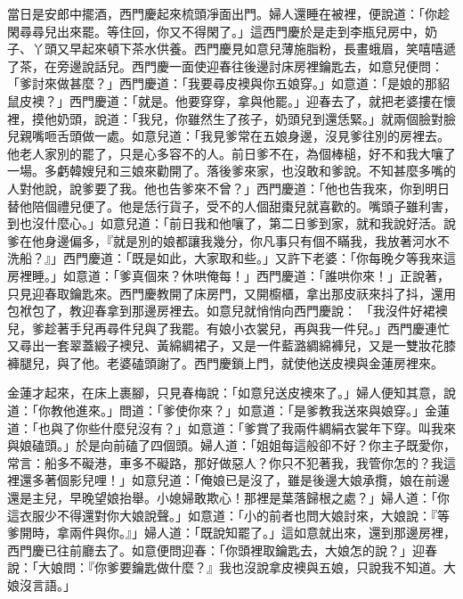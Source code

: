 當日是安郎中擺酒，西門慶起來梳頭凈面出門。婦人還睡在被裡，便說道：「你趁閑尋尋兒出來罷。等住回，你又不得閑了。」這西門慶於是走到李瓶兒房中，奶子、丫頭又早起來頓下茶水供養。西門慶見如意兒薄施脂粉，長畫蛾眉，笑嘻嘻遞了茶，在旁邊說話兒。西門慶一面使迎春往後邊討床房裡鑰匙去，如意兒便問： 「爹討來做甚麼？」西門慶道：「我要尋皮襖與你五娘穿。」如意道：「是娘的那貂鼠皮襖？」西門慶道：「就是。他要穿穿，拿與他罷。」迎春去了，就把老婆摟在懷裡，摸他奶頭，說道：「我兒，你雖然生了孩子，奶頭兒到還恁緊。」就兩個臉對臉兒親嘴咂舌頭做一處。如意兒道：「我見爹常在五娘身邊，沒見爹往別的房裡去。他老人家別的罷了，只是心多容不的人。前日爹不在，為個棒槌，好不和我大嚷了一場。多虧韓嫂兒和三娘來勸開了。落後爹來家，也沒敢和爹說。不知甚麼多嘴的人對他說，說爹要了我。他也告爹來不曾？」西門慶道：「他也告我來，你到明日替他陪個禮兒便了。他是恁行貨子，受不的人個甜棗兒就喜歡的。嘴頭子雖利害，到也沒什麼心。」如意兒道：「前日我和他嚷了，第二日爹到家，就和我說好活。說爹在他身邊偏多，『就是別的娘都讓我幾分，你凡事只有個不瞞我，我放著河水不洗船？』」西門慶道：「既是如此，大家取和些。」又許下老婆：「你每晚夕等我來這房裡睡。」如意道：「爹真個來？休哄俺每！」西門慶道：「誰哄你來！」正說著，只見迎春取鑰匙來。西門慶教開了床房門，又開櫥櫃，拿出那皮祆來抖了抖，還用包袱包了，教迎春拿到那邊房裡去。如意兒就悄悄向西門慶說： 「我沒件好裙襖兒，爹趁著手兒再尋件兒與了我罷。有娘小衣裳兒，再與我一件兒。」西門慶連忙又尋出一套翠蓋緞子襖兒、黃綿綢裙子，又是一件藍潞綢綿褲兒，又是一雙妝花膝褲腿兒，與了他。老婆磕頭謝了。西門慶鎖上門，就使他送皮襖與金蓮房裡來。

金蓮才起來，在床上裹腳，只見春梅說：「如意兒送皮襖來了。」婦人便知其意，說道：「你教他進來。」問道：「爹使你來？」如意道：「是爹教我送來與娘穿。」金蓮道：「也與了你些什麼兒沒有？」如意道：「爹賞了我兩件綢絹衣裳年下穿。叫我來與娘磕頭。」於是向前磕了四個頭。婦人道：「姐姐每這般卻不好？你主子既愛你，常言：船多不礙港，車多不礙路，那好做惡人？你只不犯著我，我管你怎的？我這裡還多著個影兒哩！」如意兒道：「俺娘已是沒了，雖是後邊大娘承攬，娘在前邊還是主兒，早晚望娘抬舉。小媳婦敢欺心！那裡是葉落歸根之處？」婦人道：「你這衣服少不得還對你大娘說聲。」如意道：「小的前者也問大娘討來，大娘說：『等爹開時，拿兩件與你。』」婦人道：「既說知罷了。」這如意就出來，還到那邊房裡，西門慶已往前廳去了。如意便問迎春：「你頭裡取鑰匙去，大娘怎的說？」迎春說：「大娘問：『你爹要鑰匙做什麼？』我也沒說拿皮襖與五娘，只說我不知道。大娘沒言語。」


